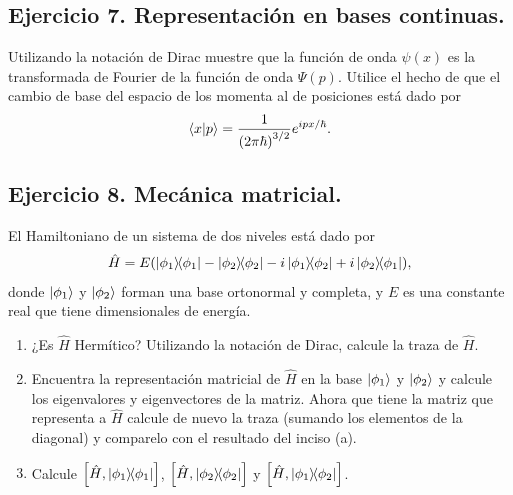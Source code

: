 \documentclass[11pt,letterpaper]{article}
\begin{document}
\subsection*{Ejercicio 7. Representación en bases continuas.}
Utilizando la notación de Dirac muestre que la función de onda $\psi(x)$ es 
la transformada de Fourier de la función de onda $\Psi (p)$. Utilice el hecho 
de que el cambio de base del espacio de los momenta al de posiciones está 
dado por
\begin{align}
\braket{x}{p}=\frac{1}{\qty(2\pi\hbar)^{3/2}}e^{ipx/\hbar}.
\end{align}

\subsection*{Ejercicio 8. Mecánica matricial.}
El Hamiltoniano de un sistema de dos niveles está dado por 
\begin{align}
\hat H=E\qty(\dyad{\phi_1}{\phi_1}-\dyad{\phi_2}{\phi_2}-i\dyad{\phi_1}{\phi_2}
+i\dyad{\phi_2}{\phi_1}),
\end{align}
donde $\ket{\phi_1}$ y $\ket{\phi_2}$ forman una base ortonormal y completa, y
$E$ es una constante real que tiene dimensionales de energía.
\begin{enumerate}
\item ¿Es $\hat H$ Hermítico? Utilizando la notación de Dirac, 
calcule la traza de $\hat H$.
\item Encuentra la representación matricial de $\hat H$ en la base 
$\ket{\phi_1}$ y $\ket{\phi_2}$ y calcule los eigenvalores y eigenvectores
de la matriz. Ahora que tiene la matriz que representa a $\hat H$ calcule de nuevo
la traza (sumando los elementos de la diagonal) y comparelo con el resultado
del inciso (a).
\item Calcule $\comm{\hat H}{\dyad{\phi_1}{\phi_1}}$, $\comm{\hat H}
{\dyad{\phi_2}{\phi_2}}$ y $\comm{\hat H}{\dyad{\phi_1}{\phi_2}}$.
\end{enumerate}
\end{document}
